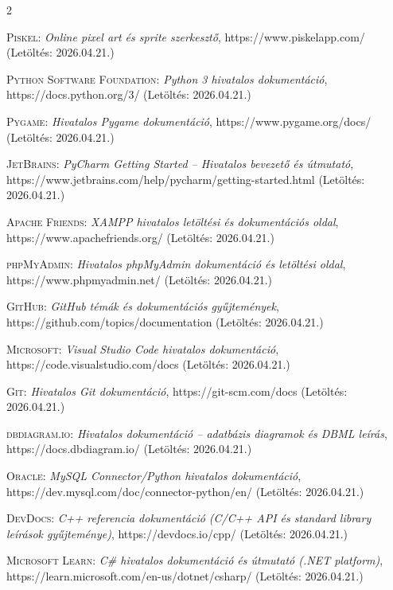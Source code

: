 \documentclass[]{thesis-ekf}
\begin{document}
	\begin{thebibliography}{2}
		\textsc{Piskel}: \emph{Online pixel art és sprite szerkesztő}, https://www.piskelapp.com/ (Letöltés: 2026.04.21.)
		
		\textsc{Python Software Foundation}: \emph{Python 3 hivatalos dokumentáció}, https://docs.python.org/3/ (Letöltés: 2026.04.21.)
		
		\textsc{Pygame}: \emph{Hivatalos Pygame dokumentáció}, https://www.pygame.org/docs/ (Letöltés: 2026.04.21.)
		
		\textsc{JetBrains}: \emph{PyCharm Getting Started – Hivatalos bevezető és útmutató}, https://www.jetbrains.com/help/pycharm/getting-started.html (Letöltés: 2026.04.21.)
		
		\textsc{Apache Friends}: \emph{XAMPP hivatalos letöltési és dokumentációs oldal}, https://www.apachefriends.org/ (Letöltés: 2026.04.21.)
		
		\textsc{phpMyAdmin}: \emph{Hivatalos phpMyAdmin dokumentáció és letöltési oldal}, https://www.phpmyadmin.net/ (Letöltés: 2026.04.21.)
		
		\textsc{GitHub}: \emph{GitHub témák és dokumentációs gyűjtemények}, https://github.com/topics/documentation (Letöltés: 2026.04.21.)
		
		\textsc{Microsoft}: \emph{Visual Studio Code hivatalos dokumentáció}, https://code.visualstudio.com/docs (Letöltés: 2026.04.21.)
		
		\textsc{Git}: \emph{Hivatalos Git dokumentáció}, https://git-scm.com/docs (Letöltés: 2026.04.21.)
		
		\textsc{dbdiagram.io}: \emph{Hivatalos dokumentáció – adatbázis diagramok és DBML leírás}, https://docs.dbdiagram.io/ (Letöltés: 2026.04.21.)
		
		\textsc{Oracle}: \emph{MySQL Connector/Python hivatalos dokumentáció}, https://dev.mysql.com/doc/connector-python/en/ (Letöltés: 2026.04.21.)
		
		\textsc{DevDocs}: \emph{C++ referencia dokumentáció (C/C++ API és standard library leírások gyűjteménye)}, https://devdocs.io/cpp/ (Letöltés: 2026.04.21.)
		
		\textsc{Microsoft Learn}: \emph{C\# hivatalos dokumentáció és útmutató (.NET platform)}, https://learn.microsoft.com/en-us/dotnet/csharp/ (Letöltés: 2026.04.21.)
		

\end{thebibliography}
\end{document}
